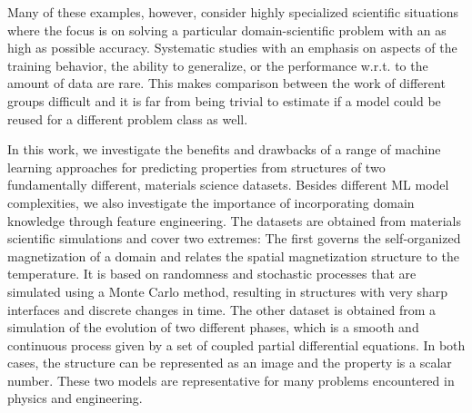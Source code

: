 \documentclass[11pt, authoryear]{elsarticle}
\begin{document}
	Many of these examples, however, consider highly specialized scientific 
	situations where the focus is on solving a particular domain-scientific problem
	with an as high as possible accuracy. Systematic studies with an emphasis on
	aspects of the training behavior, the ability to generalize, or the performance
	w.r.t. to the amount of data are rare.
	This makes comparison between the work of different groups difficult and
	it is far from being trivial to estimate if a model could be reused
	for a different problem class as well.
	
	
	
	In this work, we investigate the benefits and drawbacks of a range of 
	machine learning approaches for predicting properties from structures of two 
	fundamentally different, materials
	science datasets. Besides different \gls{ML} model complexities, we also investigate
	the importance of incorporating domain knowledge through feature engineering. 
	The datasets are obtained from materials scientific simulations and cover 
	two extremes: The first governs the self-organized magnetization of a domain 
	and relates the spatial magnetization structure to the temperature. It is based 
	on randomness and stochastic processes that are simulated using a Monte Carlo method,
	resulting in structures with very sharp interfaces and discrete changes in time. 
	The other dataset is obtained from a simulation of the evolution of two 
	different phases, which is a smooth and continuous process given by a set of 
	coupled partial differential equations. 
	In both cases, the structure can be represented as an image and the property is a
	scalar number. These two models are representative 
	for many problems encountered in physics and engineering.
	
\end{document}
